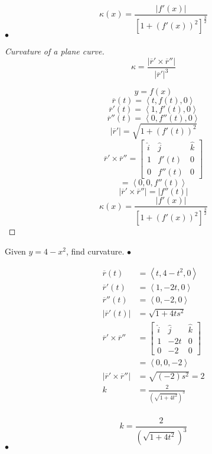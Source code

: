 \begin{definition}
	\[\kappa(x) = \frac{\left| f'(x) \right| }{\left[ 1 + (f'(x))^2 \right] ^{\frac{3}{2}}}\]
\smallskip\hfill$\bullet$\end{definition}


\begin{proof}[Curvature of a plane curve]
\[\boxed{\kappa = \frac{\left| \overline{r}' \times \overline{r}'' \right| }{\left| \overline{r}' \right|^3}}\]

\[y = f(x)\]
\[\overline{r}(t) = \left<t, f(t), 0 \right>\]
\[\overline{r}'(t) = \left<1, f'(t), 0 \right>\]
\[\overline{r}''(t) = \left<0, f''(t), 0 \right>\]
\[\left| \overline{r}' \right| = \sqrt{1 + (f'(t))^2} \]
\[\overline{r}' \times  \overline{r}'' = \begin{bmatrix}    \hat{i} & \hat{j} & \hat{k} \\ 1 & f'(t) & 0 \\ 0 & f''(t) & 0 \end{bmatrix}\]
\[= \left<0, 0, f''(t) \right>\]
\[\left|   \overline{r}' \times \overline{r}''\right| = \left| f''(t) \right| \]
	\[\kappa(x) = \frac{\left| f'(x) \right| }{\left[ 1 + (f'(x))^2 \right] ^{\frac{3}{2}}}\]
\end{proof}

\begin{example}
	Given $y = 4-x^2$, find curvature.
\smallskip\hfill$\bullet$\end{example}

\begin{solution}

	\begin{align*}
		\overline{r}(t) &=  \left<t, 4-t^2, 0 \right> \\
		\overline{r}'(t) &=  \left<1, -2t, 0 \right> \\
		\overline{r}''(t) &=  \left<0, -2, 0 \right> \\
		\left| \overline{r}'(t) \right| &= \sqrt{1+4ts^2}  \\
	\overline{r}' \times \overline{r}'' &= \begin{bmatrix} \hat{i} & \hat{j} & \hat{k} \\ 1 & -2t & 0 \\ 0 & -2 & 0 \end{bmatrix}  \\
	&= \left<0, 0, -2 \right> \\
	\left| \overline{r}' \times \overline{r}'' \right|&= \sqrt{(-2)s^2} = 2  \\
	k &= \frac{2}{(\sqrt{1 + 4t^2} )^3} \\
	\end{align*}

	\[ k = \boxed{\frac{2}{(\sqrt{1 + 4t^2} )^3}} \]
\smallskip\hfill$\bullet$\end{solution}

